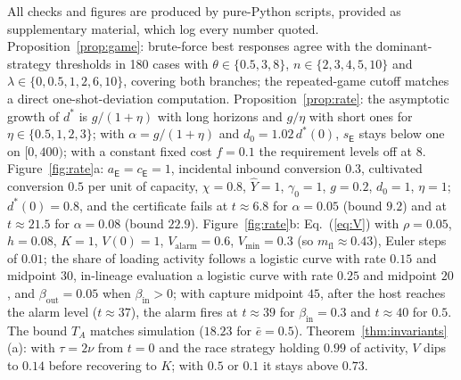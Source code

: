 \documentclass[letterpaper]{article} %
\theoremstyle{definition}
\newcommand{\dE}{\mathsf{E}}
\newcommand{\Valarm}{V_{\mathrm{alarm}}}
\newcommand{\Vmin}{V_{\min}}
\newcommand{\mfl}{m_{\mathrm{fl}}}
\begin{document}
All checks and figures are produced by pure-Python scripts, provided as supplementary material, which log every number quoted. Proposition~\ref{prop:game}: brute-force best responses agree with the dominant-strategy thresholds in 180 cases with $\theta\in\{0.5,3,8\}$, $n\in\{2,3,4,5,10\}$ and $\lambda\in\{0,0.5,1,2,6,10\}$, covering both branches; the repeated-game cutoff matches a direct one-shot-deviation computation. Proposition~\ref{prop:rate}: the asymptotic growth of $d^\ast$ is $g/(1+\eta)$ with long horizons and $g/\eta$ with short ones for $\eta\in\{0.5,1,2,3\}$; with $\alpha=g/(1+\eta)$ and $d_0=1.02\,d^\ast(0)$, $s_\dE$ stays below one on $[0,400)$; with a constant fixed cost $f=0.1$ the requirement levels off at $8$. Figure~\ref{fig:rate}a: $a_\dE=c_\dE=1$, incidental inbound conversion $0.3$, cultivated conversion $0.5$ per unit of capacity, $\chi=0.8$, $\hat Y=1$, $\gamma_0=1$, $g=0.2$, $d_0=1$, $\eta=1$; $d^\ast(0)=0.8$, and the certificate fails at $t\approx6.8$ for $\alpha=0.05$ (bound $9.2$) and at $t\approx21.5$ for $\alpha=0.08$ (bound $22.9$). Figure~\ref{fig:rate}b: Eq.~(\ref{eq:V}) with $\rho=0.05$, $h=0.08$, $K=1$, $V(0)=1$, $\Valarm=0.6$, $\Vmin=0.3$ (so $\mfl\approx0.43$), Euler steps of $0.01$; the share of loading activity follows a logistic curve with rate $0.15$ and midpoint $30$, in-lineage evaluation a logistic curve with rate $0.25$ and midpoint $20$, and $\beta_{\mathrm{out}}=0.05$ when $\beta_{\mathrm{in}}>0$; with capture midpoint $45$, after the host reaches the alarm level ($t\approx37$), the alarm fires at $t\approx39$ for $\beta_{\mathrm{in}}=0.3$ and $t\approx40$ for $0.5$. The bound $T_A$ matches simulation ($18.23$ for $\bar e=0.5$). Theorem~\ref{thm:invariants}(a): with $\tau=2\nu$ from $t=0$ and the race strategy holding $0.99$ of activity, $V$ dips to $0.14$ before recovering to $K$; with $0.5$ or $0.1$ it stays above $0.73$.
\end{document}
